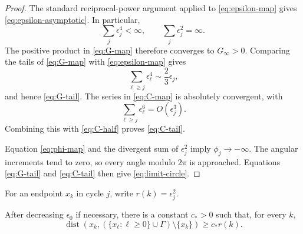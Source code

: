 \documentclass[smallextended,envcountsame]{svjour3}
\begin{document}
\begin{proof}
The standard reciprocal-power argument applied to
\eqref{eq:epsilon-map} gives \eqref{eq:epsilon-asymptotic}.  In particular,
\[
\sum_j\epsilon_j^4<\infty,
\qquad
\sum_j\epsilon_j^2=\infty.
\]
The positive product in \eqref{eq:G-map} therefore converges to
$G_\infty>0$.  Comparing the tails of \eqref{eq:G-map} with
\eqref{eq:epsilon-map} gives
\[
\sum_{\ell\ge j}\epsilon_\ell^4\sim\frac23\epsilon_j,
\]
and hence \eqref{eq:G-tail}.  The series in \eqref{eq:C-map} is absolutely
convergent, with
\[
\sum_{\ell\ge j}\epsilon_\ell^6=O(\epsilon_j^3).
\]
Combining this with \eqref{eq:C-half} proves \eqref{eq:C-tail}.

Equation \eqref{eq:phi-map} and the divergent sum of $\epsilon_j^2$ imply
$\phi_j\to-\infty$.  The angular increments tend to zero, so every angle
modulo $2\pi$ is approached.  Equations \eqref{eq:G-tail} and
\eqref{eq:C-tail} then give \eqref{eq:limit-circle}.
\end{proof}

For an endpoint $x_k$ in cycle $j$, write $r(k)=\epsilon_j^2$.

\begin{lemma}\label{lem:separation}
After decreasing $\epsilon_0$ if necessary, there is a constant $c_*>0$ such
that, for every $k$,
\begin{equation}\label{eq:separation}
\operatorname{dist}\!\left(
x_k,(\{x_\ell:\ell\ge0\}\cup\Gamma)\setminus\{x_k\}
\right)
\ge c_*r(k).
\end{equation}
\end{lemma}
\end{document}
